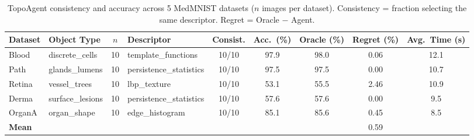 \begin{table}[t]
\centering
\caption{TopoAgent consistency and accuracy across 5 MedMNIST datasets ($n$ images per dataset). Consistency = fraction selecting the same descriptor. Regret = Oracle $-$ Agent.}
\label{tab:case_studies}
\small
\begin{tabular}{llclccccc}
\toprule
Dataset & Object Type & $n$ & Descriptor & Consist. & Acc.\ (\%) & Oracle (\%) & Regret (\%) & Avg.\ Time (s) \\
\midrule
  Blood & discrete\_cells & 10 & template\_functions & 10/10 & 97.9 & 98.0 & 0.06 & 12.1 \\
  Path & glands\_lumens & 10 & persistence\_statistics & 10/10 & 97.5 & 97.5 & 0.00 & 10.7 \\
  Retina & vessel\_trees & 10 & lbp\_texture & 10/10 & 53.1 & 55.5 & 2.46 & 10.9 \\
  Derma & surface\_lesions & 10 & persistence\_statistics & 10/10 & 57.6 & 57.6 & 0.00 & 9.5 \\
  OrganA & organ\_shape & 10 & edge\_histogram & 10/10 & 85.1 & 85.6 & 0.45 & 8.5 \\
\midrule
  \textbf{Mean} & & & & & & & 0.59 & \\
\bottomrule
\end{tabular}
\end{table}